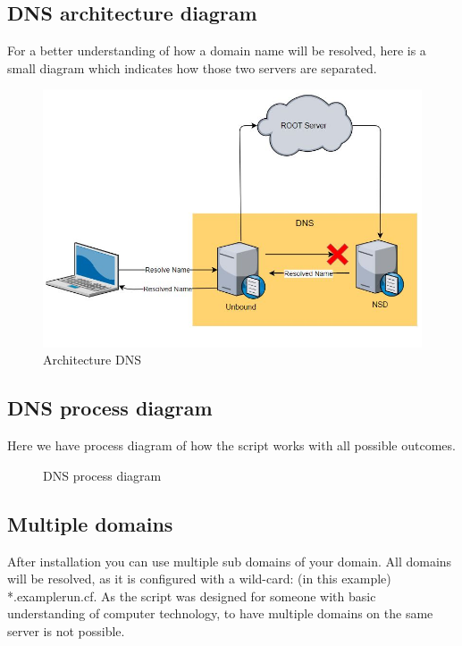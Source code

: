 \subsection{DNS architecture diagram}
For a better understanding of how a domain name will be resolved, here is a small diagram which indicates how those two servers are separated.
\begin{figure}[H]
	\centering
	\includegraphics[width=0.9\linewidth]{diagram/dns_arch_diagramm.JPG}
	\caption{Architecture DNS}
	\label{fig:beforeWeb}
\end{figure}
\newpage
\subsection{DNS process diagram}
Here we have process diagram of how the script works with all possible outcomes.

\begin{figure}[H]
	\usetikzlibrary{shapes,arrows,calc}
	\centering
	
	\caption{DNS process diagram}
\end{figure}

\subsection{Multiple domains}
After installation you can use multiple sub domains of your domain. All domains will be resolved, as it is configured with a \gls{wild-card}: (in this example) *.examplerun.cf. As the script was designed for someone with basic understanding of computer technology, to have multiple domains on the same server is not possible.

\newpage
